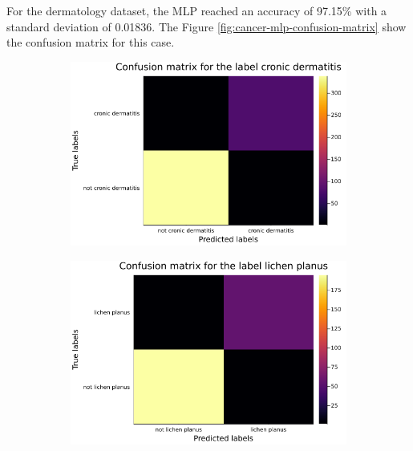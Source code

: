 \documentclass[12pt,a4paper]{article}
\begin{document}
For the dermatology dataset, the MLP reached an accuracy of 97.15\% with a standard deviation of 0.01836. The Figure \ref{fig:cancer-mlp-confusion-matrix} show the confusion matrix for this case.
\begin{figure}[H]
    \centering
    \begin{subfigure}{0.6\textwidth}
        \includegraphics[scale=.4]{../trab5 (MLP)/figs/dermatology-cronic dermatitis-confusion-matrix.png}
        \label{subfig:itema}
    \end{subfigure}
\end{figure}    
\begin{figure}[H]\ContinuedFloat
    \centering
    \begin{subfigure}{0.6\textwidth}
        \includegraphics[scale=.4]{../trab5 (MLP)/figs/dermatology-lichen planus-confusion-matrix.png}
        \label{subfig:itemb}
    \end{subfigure}
\end{figure}
\end{document}
